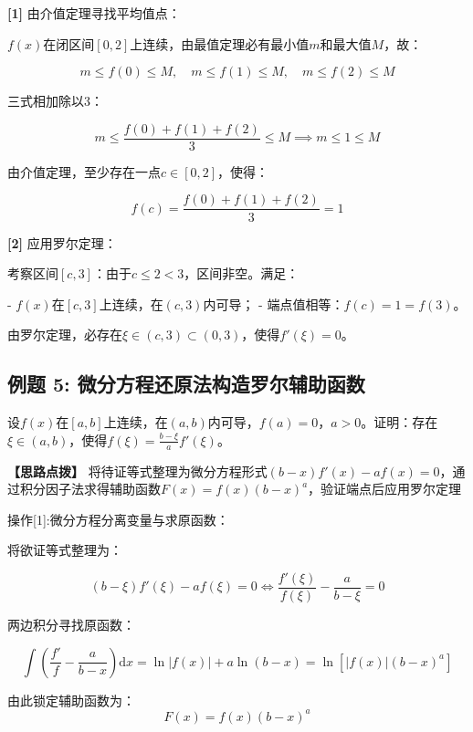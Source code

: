 \documentclass[11pt,a4paper,UTF8]{ctexart}
\begin{document}
\begin{solbox}[分步推导与答题规范]
\textbf{[1]} 由介值定理寻找平均值点：

$f(x)$在闭区间$[0, 2]$上连续，由最值定理必有最小值$m$和最大值$M$，故：


\begin{equation*}
m \le f(0) \le M, \quad m \le f(1) \le M, \quad m \le f(2) \le M
\end{equation*}


三式相加除以3：


\begin{equation*}
m \le \frac{f(0) + f(1) + f(2)}{3} \le M \implies m \le 1 \le M
\end{equation*}


由介值定理，至少存在一点$c \in [0, 2]$，使得：


\begin{equation*}
f(c) = \frac{f(0) + f(1) + f(2)}{3} = 1
\end{equation*}


\textbf{[2]} 应用罗尔定理：

考察区间$[c, 3]$：由于$c \le 2 < 3$，区间非空。满足：

- $f(x)$在$[c, 3]$上连续，在$(c, 3)$内可导；
- 端点值相等：$f(c) = 1 = f(3)$。

由罗尔定理，必存在$\xi \in (c, 3) \subset (0, 3)$，使得$f'(\xi) = 0$。
\end{solbox}


\subsection{例题 5: 微分方程还原法构造罗尔辅助函数}

设$f(x)$在$[a, b]$上连续，在$(a, b)$内可导，$f(a) = 0$，$a > 0$。证明：存在$\xi \in (a, b)$，使得$f(\xi) = \frac{b - \xi}{a} f'(\xi)$。

\textbf{\color{DeepPurple}【思路点拨】} 将待证等式整理为微分方程形式$(b - x)f'(x) - a f(x) = 0$，通过积分因子法求得辅助函数$F(x) = f(x)(b - x)^a$，验证端点后应用罗尔定理


操作[1]:微分方程分离变量与求原函数：

\begin{solbox}[分步推导与答题规范]
将欲证等式整理为：


\begin{equation*}
(b - \xi)f'(\xi) - a f(\xi) = 0 \iff \frac{f'(\xi)}{f(\xi)} - \frac{a}{b - \xi} = 0
\end{equation*}


两边积分寻找原函数：


\begin{equation*}
\int \left(\frac{f'}{f} - \frac{a}{b - x}\right)\mathrm{d}x = \ln \vert{}f(x)\vert{} + a \ln (b - x) = \ln \left[\vert{}f(x)\vert{} (b - x)^a\right]
\end{equation*}


由此锁定辅助函数为：
\begin{equation*}
F(x) = f(x)(b - x)^a
\end{equation*}

\end{solbox}
\end{document}
